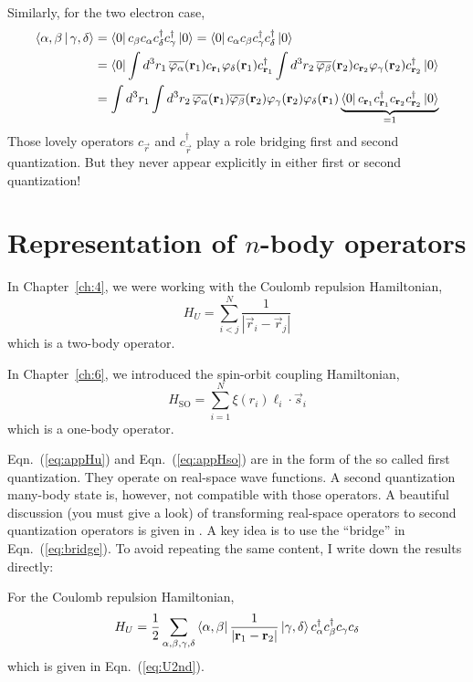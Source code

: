 Similarly, for the two electron case,
\begin{align}
\Braket{\alpha,\beta|\gamma,\delta}
& = \Bra{0} c_\beta c_\alpha c_\delta^\dagger c_\gamma^\dagger \Ket{0}
= \Bra{0} c_\alpha c_\beta c_\gamma^\dagger c_\delta^\dagger \Ket{0} \nonumber \\
& = \Bra{0} \int d^3r_1\, \conj{\varphi_\alpha}(\vec{r}_1) c_{\vec{r}_1} \varphi_\delta(\vec{r}_1) c_{\vec{r}_1}^\dagger
\int d^3r_2\, \conj{\varphi_\beta}(\vec{r}_2) c_{\vec{r}_2} \varphi_\gamma(\vec{r}_2) c_{\vec{r}_2}^\dagger \Ket{0} \nonumber \\
& = \int d^3r_1\int d^3r_2\, \conj{\varphi_\alpha}(\vec{r}_1) \conj{\varphi_\beta}(\vec{r}_2) \varphi_\gamma(\vec{r}_2) \varphi_\delta(\vec{r}_1) \underbrace{\Bra{0} c_{\vec{r}_1} c_{\vec{r}_1}^\dagger c_{\vec{r}_2} c_{\vec{r}_2}^\dagger \Ket{0}}_{=1}
\end{align}
Those lovely operators $c_{\vec{r}}$ and $c_{\vec{r}}^\dagger$ play a role
bridging first and second quantization. But they never appear explicitly
in either first or second quantization!

\section{Representation of $n$-body operators}
In Chapter~\ref{ch:4}, we were working with the Coulomb repulsion Hamiltonian,
\begin{equation} \label{eq:appHu}
H_U = \sum_{i<j}^N \frac{1}{|\vec{r}_i - \vec{r}_j|}
\end{equation}
which is a two-body operator.

In Chapter~\ref{ch:6}, we introduced the spin-orbit coupling Hamiltonian,
\begin{equation} \label{eq:appHso}
H_\text{SO} = \sum_{i=1}^N \xi(r_i) \boldsymbol{\ell}_i\cdot\vec{s}_i
\end{equation}
which is a one-body operator.

Eqn.~(\ref{eq:appHu}) and Eqn.~(\ref{eq:appHso}) are in the form of
the so called first quantization. They operate on real-space wave functions.
A second quantization many-body state is, however, not compatible with
those operators. A beautiful discussion (you must give a look)
of transforming real-space operators to second quantization operators
is given in \cite{GBK}. A key idea is to use the ``bridge'' in Eqn.~(\ref{eq:bridge}).
To avoid repeating the same content, I write down the results directly:

For the Coulomb repulsion Hamiltonian,
\begin{equation}
H_U = \frac{1}{2} \sum_{\alpha,\beta,\gamma,\delta} \Bra{\alpha,\beta} \frac{1}{|\vec{r}_1-\vec{r}_2|} \Ket{\gamma,\delta} c_\alpha^\dag c_\beta^\dag c_\gamma c_\delta
\end{equation}
which is given in Eqn.~(\ref{eq:U2nd}).

